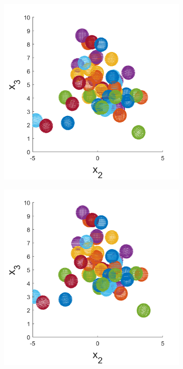 \begin{figure}
\begin{subfigure}[b]{0.22\textwidth}
    \caption[]{\label{fig:squirmerPosF}}
\end{subfigure}
\begin{subfigure}[b]{0.22\textwidth}
    \centering
    \includegraphics[width=\textwidth]{Images/squirmers/Gyro-7-All.pdf}
    \caption[]{\label{fig:squirmerPosG}}
\end{subfigure}
\begin{subfigure}[b]{0.22\textwidth}
    \centering
    \includegraphics[width=\textwidth]{Images/squirmers/Gyro-8-All.pdf}

\end{subfigure}
\end{figure}
